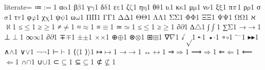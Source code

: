 {%
literate=
{≔}{{\ensuremath{\mathrm{:=}}}}1
{α}{{\ensuremath{\mathrm{\alpha}}}}1
{β}{{\ensuremath{\mathrm{\beta}}}}1
{γ}{{\ensuremath{\mathrm{\gamma}}}}1
{δ}{{\ensuremath{\mathrm{\delta}}}}1
{ε}{{\ensuremath{\mathrm{\varepsilon}}}}1
{ζ}{{\ensuremath{\mathrm{\zeta}}}}1
{η}{{\ensuremath{\mathrm{\eta}}}}1
{θ}{{\ensuremath{\mathrm{\theta}}}}1
{ι}{{\ensuremath{\mathrm{\iota}}}}1
{κ}{{\ensuremath{\mathrm{\kappa}}}}1
{μ}{{\ensuremath{\mathrm{\mu}}}}1
{ν}{{\ensuremath{\mathrm{\nu}}}}1
{ξ}{{\ensuremath{\mathrm{\xi}}}}1
{π}{{\ensuremath{\mathrm{\mathnormal{\pi}}}}}1
{ρ}{{\ensuremath{\mathrm{\rho}}}}1
{σ}{{\ensuremath{\mathrm{\sigma}}}}1
{τ}{{\ensuremath{\mathrm{\tau}}}}1
{φ}{{\ensuremath{\mathrm{\varphi}}}}1
{χ}{{\ensuremath{\mathrm{\chi}}}}1
{ψ}{{\ensuremath{\mathrm{\psi}}}}1
{ω}{{\ensuremath{\mathrm{\omega}}}}1
{Π}{{\ensuremath{\mathrm{\Pi}}}}1
{Γ}{{\ensuremath{\mathrm{\Gamma}}}}1
{Δ}{{\ensuremath{\mathrm{\Delta}}}}1
{Θ}{{\ensuremath{\mathrm{\Theta}}}}1
{Λ}{{\ensuremath{\mathrm{\Lambda}}}}1
{Σ}{{\ensuremath{\mathrm{\Sigma}}}}1
{Φ}{{\ensuremath{\mathrm{\Phi}}}}1
{Ξ}{{\ensuremath{\mathrm{\Xi}}}}1
{Ψ}{{\ensuremath{\mathrm{\Psi}}}}1
{Ω}{{\ensuremath{\mathrm{\Omega}}}}1
{ℵ}{{\ensuremath{\aleph}}}1
{≤}{{\ensuremath{\leq}}}1
{≥}{{\ensuremath{\geq}}}1
{≠}{{\ensuremath{\neq}}}1
{≈}{{\ensuremath{\approx}}}1
{≡}{{\ensuremath{\equiv}}}1
{≃}{{\ensuremath{\simeq}}}1
{≤}{{\ensuremath{\leq}}}1
{≥}{{\ensuremath{\geq}}}1
{∂}{{\ensuremath{\partial}}}1
{∆}{{\ensuremath{\triangle}}}1 %
{∫}{{\ensuremath{\int}}}1
{∑}{{\ensuremath{\mathrm{\Sigma}}}}1
{→}{{\ensuremath{\rightarrow}}}1
{⊥}{{\ensuremath{\perp}}}1
{∞}{{\ensuremath{\infty}}}1
{∂}{{\ensuremath{\partial}}}1
{∓}{{\ensuremath{\mp}}}1
{±}{{\ensuremath{\pm}}}1
{×}{{\ensuremath{\times}}}1
{⊕}{{\ensuremath{\oplus}}}1
{⊗}{{\ensuremath{\otimes}}}1
{⊞}{{\ensuremath{\boxplus}}}1
{∇}{{\ensuremath{\nabla}}}1
{√}{{\ensuremath{\sqrt}}}1
{⬝}{{\ensuremath{\cdot}}}1
{•}{{\ensuremath{\cdot}}}1
{∘}{{\ensuremath{\circ}}}1
{⁻}{{\ensuremath{^{-}}}}1
{▸}{{\ensuremath{\blacktriangleright}}}1
{∧}{{\ensuremath{\wedge}}}1
{∨}{{\ensuremath{\vee}}}1
{¬}{{\ensuremath{\neg}}}1
{⊢}{{\ensuremath{\vdash}}}1
{⟨}{{\ensuremath{\langle}}}1
{⟩}{{\ensuremath{\rangle}}}1
{↦}{{\ensuremath{\mapsto}}}1
{→}{{\ensuremath{\rightarrow}}}1
{↔}{{\ensuremath{\leftrightarrow}}}1
{⇒}{{\ensuremath{\Rightarrow}}}1
{⟹}{{\ensuremath{\Longrightarrow}}}1
{⇐}{{\ensuremath{\Leftarrow}}}1
{⟸}{{\ensuremath{\Longleftarrow}}}1
{∩}{{\ensuremath{\cap}}}1
{∪}{{\ensuremath{\cup}}}1
{⊂}{{\ensuremath{\subseteq}}}1
{⊆}{{\ensuremath{\subseteq}}}1
{⊄}{{\ensuremath{\nsubseteq}}}1
}
